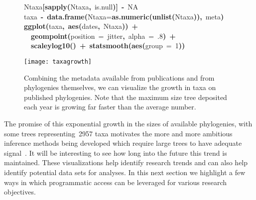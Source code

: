\documentclass[authoryear, preprint]{elsarticle}
\makeatletter
\newcommand{\hlnumber}[1]{\textcolor[rgb]{0,0,0}{#1}}%
\newcommand{\hlfunctioncall}[1]{\textcolor[rgb]{.5,0,.33}{\textbf{#1}}}%
\newcommand{\hlstring}[1]{\textcolor[rgb]{.6,.6,1}{#1}}%
\newcommand{\hlkeyword}[1]{\textbf{#1}}%
\newcommand{\hlargument}[1]{\textcolor[rgb]{.69,.25,.02}{#1}}%
\newcommand{\hlassignement}[1]{\textbf{#1}}%
\newcommand{\hlsymbol}[1]{#1}%
\newcommand{\hlstd}[1]{\textcolor[rgb]{0,0,0}{#1}}%
\newenvironment{kframe}{%
 \def\FrameCommand##1{\hskip\@totalleftmargin \hskip-\fboxsep
 \colorbox{shadecolor}{##1}\hskip-\fboxsep
     \hskip-\linewidth \hskip-\@totalleftmargin \hskip\columnwidth}%
 \MakeFramed {\advance\hsize-\width
   \@totalleftmargin\z@ \linewidth\hsize
   \@setminipage}}%
 {\par\unskip\endMakeFramed}
\newenvironment{knitrout}{}{} %
\makeatother
\begin{document}
\begin{figure}
\begin{knitrout}
\begin{kframe}
\begin{flushleft}
\hlstd{}\hlsymbol{Ntaxa}\hlkeyword{[}\hlfunctioncall{sapply}\hlkeyword{(}\hlsymbol{Ntaxa}\hlkeyword{,}{\ }\hlsymbol{is.null}\hlkeyword{)}\hlkeyword{]}{\ }\hlassignement{\usebox{\hlnormalsizeboxlessthan}-}{\ }\hlnumber{NA}\hspace*{\fill}\\
\hlstd{}\hlsymbol{taxa}{\ }\hlassignement{\usebox{\hlnormalsizeboxlessthan}-}{\ }\hlfunctioncall{data.frame}\hlkeyword{(}\hlargument{Ntaxa}\hlargument{=}\hlfunctioncall{as.numeric}\hlkeyword{(}\hlfunctioncall{unlist}\hlkeyword{(}\hlsymbol{Ntaxa}\hlkeyword{)}\hlkeyword{)}\hlkeyword{,}{\ }\hlsymbol{meta}\hlkeyword{)}\hspace*{\fill}\\
\hlstd{}\hlfunctioncall{ggplot}\hlkeyword{(}\hlsymbol{taxa}\hlkeyword{,}{\ }\hlfunctioncall{aes}\hlkeyword{(}\hlsymbol{dates}\hlkeyword{,}{\ }\hlsymbol{Ntaxa}\hlkeyword{)}\hlkeyword{)}{\ }\hlkeyword{+}\hspace*{\fill}\\
\hlstd{}{\ }{\ }\hlfunctioncall{geom\usebox{\hlnormalsizeboxunderscore}point}\hlkeyword{(}\hlargument{position}{\ }\hlargument{=}{\ }\hlstring{\usebox{\hlnormalsizeboxsinglequote}jitter\usebox{\hlnormalsizeboxsinglequote}}\hlkeyword{,}{\ }\hlargument{alpha}{\ }\hlargument{=}{\ }\hlnumber{.8}\hlkeyword{)}{\ }\hlkeyword{+}\hspace*{\fill}\\
\hlstd{}{\ }{\ }\hlfunctioncall{scale\usebox{\hlnormalsizeboxunderscore}y\usebox{\hlnormalsizeboxunderscore}log10}\hlkeyword{(}\hlkeyword{)}{\ }\hlkeyword{+}{\ }\hlfunctioncall{stat\usebox{\hlnormalsizeboxunderscore}smooth}\hlkeyword{(}\hlfunctioncall{aes}\hlkeyword{(}\hlargument{group}{\ }\hlargument{=}{\ }\hlnumber{1}\hlkeyword{)}\hlkeyword{)}\mbox{}
\normalfont
\end{flushleft}
\texttt{[image: taxagrowth]} \end{kframe}
\end{knitrout}

\caption{Combining the metadata available from publications and from phylogenies themselves,
we can visualize the growth in taxa on published phylogenies. 
Note that the maximum size tree deposited each year is growing far faster than the average number.}\label{fig:2}
\end{figure}
The promise of this exponential growth in the sizes of available phylogenies,
with some trees representing~2957 taxa motivates
the more and more ambitious inference methods being developed
which require large trees to have adequate signal~\citep{Boettiger2012, FitzJohn2009}.
It will be interesting to see how long into the future this trend is maintained.
These visualizations help identify research trends and can also help identify potential data sets for analyses. 
In this next section we highlight a few ways in which programmatic access can be leveraged for various research objectives.  
\end{document}
